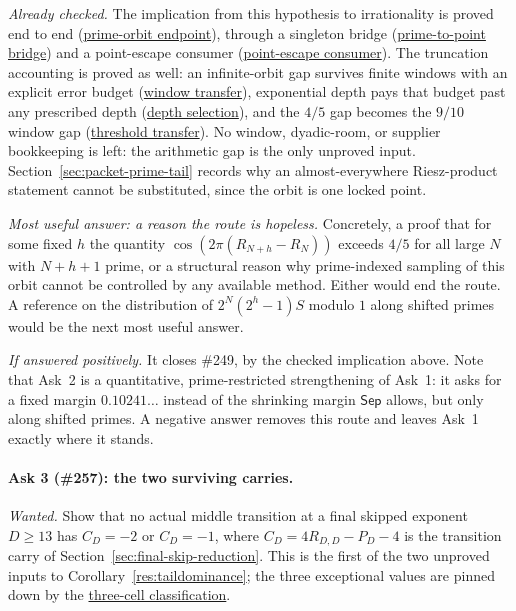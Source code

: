 \documentclass[11pt]{article}
\newcommand{\commit}{99f4bf47422abbd8757cbb22b50ba079d764d3a7}
\newcommand{\repobase}{https://github.com/wcook04/plectis-erdos/blob/\commit}
\newcommand{\PK}{Erdos249257}
\newcommand{\lword}[4]{\href{\repobase/\PK/#1\#L#2}{#4}}
\theoremstyle{definition}
\theoremstyle{remark}
\begin{document}
\emph{Already checked.}  The implication from this hypothesis to
irrationality is proved end to end
(\lword{PivotAntiReconstruction.lean}{1574}{irrational_totient_series_of_naturalPrimeTailOrbitGap}{prime-orbit endpoint}),
through a singleton bridge
(\lword{PivotAntiReconstruction.lean}{1266}{naturalPivotPointEscape_of_naturalPrimeTailOrbitGap}{prime-to-point bridge})
and a point-escape consumer
(\lword{PivotAntiReconstruction.lean}{1550}{irrational_totient_series_of_naturalPivotPointEscape}{point-escape consumer}).
The truncation accounting is proved as well: an infinite-orbit gap survives
finite windows with an explicit error budget
(\lword{PivotAntiReconstruction.lean}{220}{windowFirstCos_le_add_of_tailOrbitGap}{window transfer}),
exponential depth pays that budget past any prescribed depth
(\lword{PivotAntiReconstruction.lean}{257}{exists_natural_window_depth_with_error}{depth selection}),
and the \(4/5\) gap becomes the \(9/10\) window gap
(\lword{PivotAntiReconstruction.lean}{233}{windowFirstCos_le_nine_tenths_of_tailOrbitGap}{threshold transfer}).
No window, dyadic-room, or supplier bookkeeping is left: the arithmetic gap
is the only unproved input.  Section~\ref{sec:packet-prime-tail} records why
an almost-everywhere Riesz-product statement cannot be substituted, since the
orbit is one locked point.

\emph{Most useful answer: a reason the route is hopeless.}  Concretely, a
proof that for some fixed \(h\) the quantity \(\cos(2\pi(R_{N+h}-R_N))\)
exceeds \(4/5\) for all large \(N\) with \(N+h+1\) prime, or a structural
reason why prime-indexed sampling of this orbit cannot be controlled by any
available method.  Either would end the route.  A reference on the
distribution of \(2^{N}(2^{h}-1)S\) modulo \(1\) along shifted primes would
be the next most useful answer.

\emph{If answered positively.}  It closes \#249, by the checked implication
above.  Note that Ask~2 is a quantitative, prime-restricted strengthening of
Ask~1: it asks for a fixed margin \(0.10241\ldots\) instead of the shrinking
margin \(\mathsf{Sep}\) allows, but only along shifted primes.  A negative
answer removes this route and leaves Ask~1 exactly where it stands.

\paragraph{Ask 3 (\#257): the two surviving carries.}
\emph{Wanted.}  Show that no actual middle transition at a final skipped
exponent \(D\ge13\) has \(C_D=-2\) or \(C_D=-1\), where
\(C_D=4R_{D,D}-P_D-4\) is the transition carry of
Section~\ref{sec:final-skip-reduction}.  This is the first of the two
unproved inputs to Corollary~\ref{res:taildominance}; the three exceptional
values are pinned down by the
\lword{HalfCylinderMiddleCarryLowerBound.lean}{4125}{seamMiddleCoordinate_not_safe_iff_three_cells}{three-cell classification}.
\end{document}
